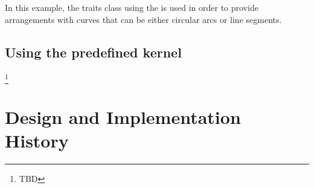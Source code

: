 In this example, the traits class using the
is used in order to provide arrangements with curves that can be
either circular arcs or line segments.


	\subsection{Using the predefined kernel} 


\footnote{TBD}

\section{Design and Implementation History}
